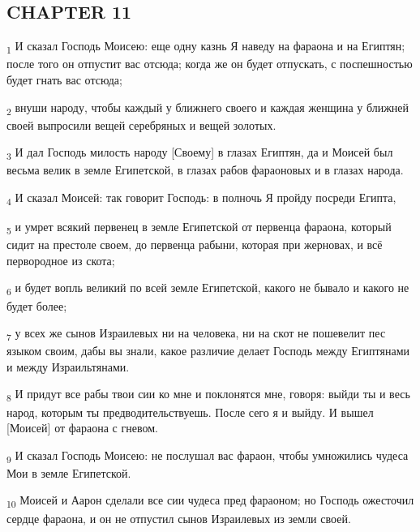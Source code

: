\subsection{CHAPTER 11}
\begin{tcolorbox}
\textsubscript{1} И сказал Господь Моисею: еще одну казнь Я наведу на фараона и на Египтян; после того он отпустит вас отсюда; когда же он будет отпускать, с поспешностью будет гнать вас отсюда;
\end{tcolorbox}
\begin{tcolorbox}
\textsubscript{2} внуши народу, чтобы каждый у ближнего своего и каждая женщина у ближней своей выпросили вещей серебряных и вещей золотых.
\end{tcolorbox}
\begin{tcolorbox}
\textsubscript{3} И дал Господь милость народу [Своему] в глазах Египтян, да и Моисей был весьма велик в земле Египетской, в глазах рабов фараоновых и в глазах народа.
\end{tcolorbox}
\begin{tcolorbox}
\textsubscript{4} И сказал Моисей: так говорит Господь: в полночь Я пройду посреди Египта,
\end{tcolorbox}
\begin{tcolorbox}
\textsubscript{5} и умрет всякий первенец в земле Египетской от первенца фараона, который сидит на престоле своем, до первенца рабыни, которая при жерновах, и всё первородное из скота;
\end{tcolorbox}
\begin{tcolorbox}
\textsubscript{6} и будет вопль великий по всей земле Египетской, какого не бывало и какого не будет более;
\end{tcolorbox}
\begin{tcolorbox}
\textsubscript{7} у всех же сынов Израилевых ни на человека, ни на скот не пошевелит пес языком своим, дабы вы знали, какое различие делает Господь между Египтянами и между Израильтянами.
\end{tcolorbox}
\begin{tcolorbox}
\textsubscript{8} И придут все рабы твои сии ко мне и поклонятся мне, говоря: выйди ты и весь народ, которым ты предводительствуешь. После сего я и выйду. И вышел [Моисей] от фараона с гневом.
\end{tcolorbox}
\begin{tcolorbox}
\textsubscript{9} И сказал Господь Моисею: не послушал вас фараон, чтобы умножились чудеса Мои в земле Египетской.
\end{tcolorbox}
\begin{tcolorbox}
\textsubscript{10} Моисей и Аарон сделали все сии чудеса пред фараоном; но Господь ожесточил сердце фараона, и он не отпустил сынов Израилевых из земли своей.
\end{tcolorbox}
